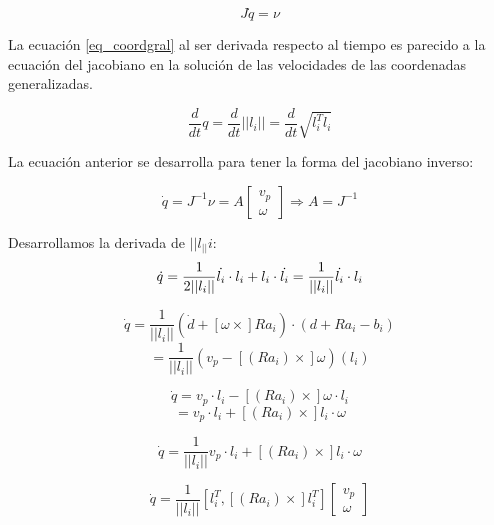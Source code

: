 \begin{equation} \label{equgral_q}
J\dot{q}=\nu
\end{equation}

La ecuación \ref{eq_coordgral} al ser derivada respecto al 
tiempo es parecido a la ecuación del jacobiano en la 
solución de las velocidades de las coordenadas 
generalizadas.

\begin{equation}
\frac{d}{dt}q = \frac{d}{dt}||l_i|| = \frac{d}{dt}\sqrt{l_i^Tl_i} 
\end{equation}

La ecuación anterior se desarrolla para tener la forma del 
jacobiano inverso:

\begin{equation}
\dot{q}=J^{-1} \nu = A \begin{bmatrix}
v_p\\
\omega
\end{bmatrix} \Rightarrow A = J^{-1}
\end{equation}

Desarrollamos la derivada de $||l_||i$:
\begin{equation}
\dot{q} = \frac{1}{2||l_i||} \dot{l_i} \cdot l_i + l_i \cdot \dot{l_i} = \frac{1}{||l_i||} \dot{l_i} \cdot l_i \\ \bigskip
\end{equation}

\begin{equation}
\dot{q}=\frac{1}{||l_i||}(\dot{d} + [\omega \times] Ra_i)\cdot(d + Ra_i -b_i) 
\end{equation}
\begin{equation*}
= \frac{1}{||l_i||}(v_p - [(Ra_i)\times]\omega)(l_i)
\end{equation*}

\begin{equation}
\dot{q} = v_p \cdot l_i - [(Ra_i)\times]\omega \cdot l_i 
\end{equation}
\begin{equation*}
= v_p \cdot l_i + [(Ra_i)\times]l_i \cdot \omega
\end{equation*}

\begin{equation}
\dot{q} = \frac{1}{||l_i||} v_p \cdot l_i + [(Ra_i)\times]l_i \cdot \omega
\end{equation}

\begin{equation} \label{jac_inv}
\dot{q} = \frac{1}{||l_i||} [l_i^T , [(Ra_i)\times]l_i^T] \begin{bmatrix}
v_p\\
\omega
\end{bmatrix}
\end{equation}

